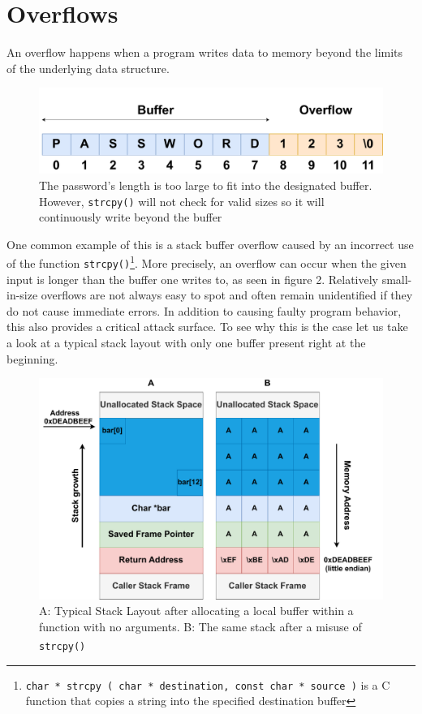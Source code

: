 \documentclass[10pt,twocolumn,a4paper]{article}
\begin{document}
\section{Overflows}\label{sec:Overflows}
An overflow happens when a program writes data to memory beyond the limits of the underlying data structure.
\begin{figure}[h]
\centering
\includegraphics[keepaspectratio,width=\linewidth,trim={0 0 0 1.5cm}]{fig/simpleoverflow}
\caption{The password's length is too large to fit into the designated buffer. However, \texttt{strcpy()} will not check for valid sizes so it will continuously write beyond the buffer}
\end{figure}\newline
One common example of this is a stack buffer overflow caused by an incorrect use of the function \texttt{strcpy()}\footnote{\texttt{char * strcpy ( char * destination, const char * source )} is a C function that copies a string into the specified destination buffer}.\newline
More precisely, an overflow can occur when the given input is longer than the buffer one writes to, as seen in figure 2.
Relatively small-in-size overflows are not always easy to spot and often remain unidentified if they do not cause immediate errors.
In addition to causing faulty program behavior, this also provides a critical attack surface.
To see why this is the case let us take a look at a typical stack layout with only one buffer present right at the beginning.
\begin{figure}[h]
	\begin{center}
		\centering
		\includegraphics[keepaspectratio,width=\linewidth,trim={1cm 0 1cm 0}]{fig/Stacks}
		\caption{ A: Typical Stack Layout after allocating a local buffer within a function with no arguments. \newline B: The same stack after a misuse of \texttt{strcpy()}\textsuperscript{\cite{wiki}}}
	\end{center}
\end{figure}
\end{document}
